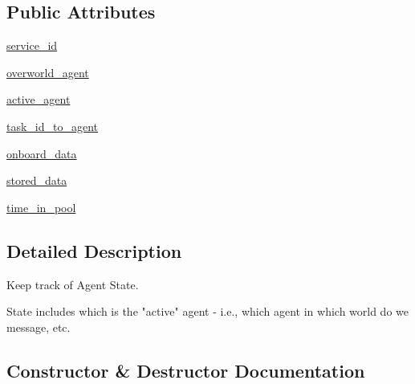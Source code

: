 \subsection*{Public Attributes}
\begin{DoxyCompactItemize}
\item 
\hyperlink{classparlai_1_1chat__service_1_1core_1_1chat__service__manager_1_1AgentState_ae81955487ddb55627cf08956490fb3a9}{service\+\_\+id}
\item 
\hyperlink{classparlai_1_1chat__service_1_1core_1_1chat__service__manager_1_1AgentState_a1780b29283e18b7b7e6d674ba5ea0907}{overworld\+\_\+agent}
\item 
\hyperlink{classparlai_1_1chat__service_1_1core_1_1chat__service__manager_1_1AgentState_a7a655f0e572d17c98d0651024a88799d}{active\+\_\+agent}
\item 
\hyperlink{classparlai_1_1chat__service_1_1core_1_1chat__service__manager_1_1AgentState_a1efa5479b623ca88b7f87499e614e805}{task\+\_\+id\+\_\+to\+\_\+agent}
\item 
\hyperlink{classparlai_1_1chat__service_1_1core_1_1chat__service__manager_1_1AgentState_a147489a82a99a94ea2b95aeb24113be7}{onboard\+\_\+data}
\item 
\hyperlink{classparlai_1_1chat__service_1_1core_1_1chat__service__manager_1_1AgentState_afd5dec08a8a550c3bedff7a6cfb38307}{stored\+\_\+data}
\item 
\hyperlink{classparlai_1_1chat__service_1_1core_1_1chat__service__manager_1_1AgentState_aa4fbf177376f8de421cc02841365b0df}{time\+\_\+in\+\_\+pool}
\end{DoxyCompactItemize}


\subsection{Detailed Description}
\begin{DoxyVerb}Keep track of Agent State.

State includes which is the "active" agent - i.e., which agent in which
world do we message, etc.
\end{DoxyVerb}
 

\subsection{Constructor \& Destructor Documentation}
\mbox{\label{classparlai_1_1chat__service_1_1core_1_1chat__service__manager_1_1AgentState_a9b5a2611095c2f946898f1d77fa38f38}} 
